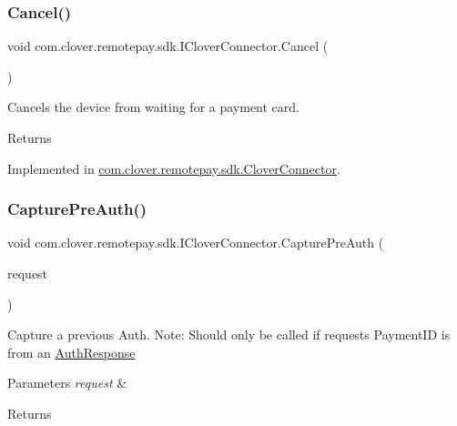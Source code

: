 \subsubsection{\texorpdfstring{Cancel()}{Cancel()}}
{\footnotesize\ttfamily void com.\+clover.\+remotepay.\+sdk.\+I\+Clover\+Connector.\+Cancel (\begin{DoxyParamCaption}{ }\end{DoxyParamCaption})}



Cancels the device from waiting for a payment card. 

\begin{DoxyReturn}{Returns}

\end{DoxyReturn}


Implemented in \hyperlink{classcom_1_1clover_1_1remotepay_1_1sdk_1_1_clover_connector_a6ca6015f34bf85df7d4242add5751606}{com.\+clover.\+remotepay.\+sdk.\+Clover\+Connector}.

\mbox{\label{interfacecom_1_1clover_1_1remotepay_1_1sdk_1_1_i_clover_connector_a1687202a30277f4ae5dffd73b9311b94}} 
\subsubsection{\texorpdfstring{Capture\+Pre\+Auth()}{CapturePreAuth()}}
{\footnotesize\ttfamily void com.\+clover.\+remotepay.\+sdk.\+I\+Clover\+Connector.\+Capture\+Pre\+Auth (\begin{DoxyParamCaption}\item[{\hyperlink{classcom_1_1clover_1_1remotepay_1_1sdk_1_1_capture_pre_auth_request}{Capture\+Pre\+Auth\+Request}}]{request }\end{DoxyParamCaption})}



Capture a previous Auth. Note\+: Should only be called if request\textquotesingle{}s Payment\+ID is from an \hyperlink{classcom_1_1clover_1_1remotepay_1_1sdk_1_1_auth_response}{Auth\+Response} 


\begin{DoxyParams}{Parameters}
{\em request} & \\
\hline
\end{DoxyParams}
\begin{DoxyReturn}{Returns}

\end{DoxyReturn}


